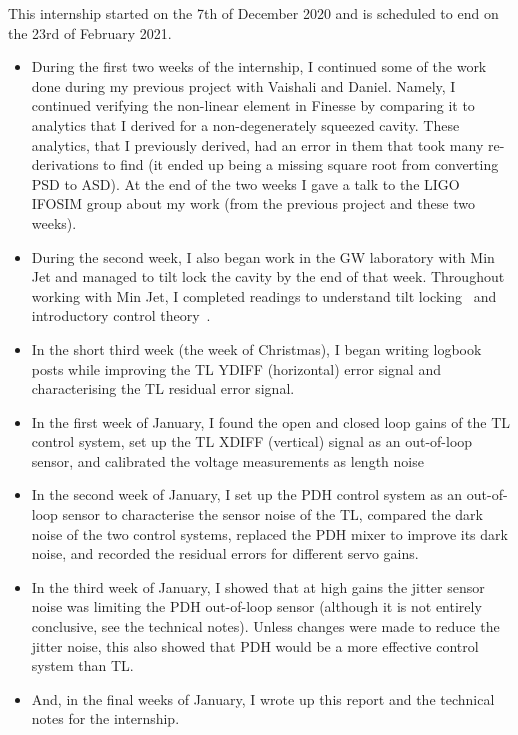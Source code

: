 \documentclass[aps,pra,superscriptaddress,reprint,nofootinbib]{revtex4-1}
\begin{document}
This internship started on the 7th of December 2020 and is scheduled to end on the 23rd of February 2021.

\begin{itemize}
\item During the first two weeks of the internship, I continued some of the work done during my previous project with Vaishali and Daniel. Namely, I continued verifying the non-linear element in Finesse by comparing it to analytics that I derived for a non-degenerately squeezed cavity. These analytics, that I previously derived, had an error in them that took many re-derivations to find (it ended up being a missing square root from converting PSD to ASD).
At the end of the two weeks I gave a talk to the LIGO IFOSIM group about my work (from the previous project and these two weeks).
\item During the second week, I also began work in the GW laboratory with Min Jet and managed to tilt lock the cavity by the end of that week. Throughout working with Min Jet, I completed readings to understand tilt locking~\cite{TL:1999} and introductory control theory~\cite{Ward:2010,Bechhoefer:2005,FCS:2000}.
\item In the short third week (the week of Christmas), I began writing logbook posts while improving the TL YDIFF (horizontal) error signal and characterising the TL residual error signal.
\item In the first week of January, I found the open and closed loop gains of the TL control system, set up the TL XDIFF (vertical) signal as an out-of-loop sensor, and calibrated the voltage measurements as length noise
\item In the second week of January, I set up the PDH control system as an out-of-loop sensor to characterise the sensor noise of the TL, compared the dark noise of the two control systems, replaced the PDH mixer to improve its dark noise, and recorded the residual errors for different servo gains.
\item In the third week of January, I showed that at high gains the jitter sensor noise was limiting the PDH out-of-loop sensor (although it is not entirely conclusive, see the technical notes). Unless changes were made to reduce the jitter noise, this also showed that PDH would be a more effective control system than TL.
\item And, in the final weeks of January, I wrote up this report and the technical notes for the internship.
\end{itemize}
\end{document}
